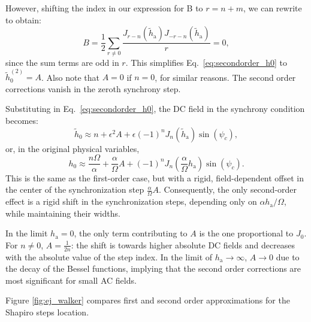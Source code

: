 \documentclass[prb,aps,twocolumn,superscriptaddress,floatfix]{revtex4-1}
\begin{document}
However, shifting the index in our expression for B to $r=n+m$, we can rewrite to obtain:
%
\begin{equation}
    B=\frac{1}{2}\sum_{r\neq 0} \frac{J_{r-n}(\tilde h_\text{a})J_{-r-n}(\tilde h_\text{a})}{r}=0,
\end{equation}
%
since the sum terms are odd in $r$. This simplifies Eq.~\eqref{eq:secondorder_h0} to $\tilde{h}_0^{(2)}=A$. Also note that $A=0$ if $n=0$, for similar reasons. The second order corrections vanish in the zeroth synchrony step.

Substituting in Eq.~\eqref{eq:secondorder_h0}, the DC field in the synchrony condition becomes:
%
\begin{equation}
    \tilde h_0 \approx n + \epsilon^2A + \epsilon(-1)^n J_n(\tilde h_\text{a})\sin(\psi_c),
\end{equation}
%
or, in the original physical variables,
%
\begin{equation}
    h_0 \approx \frac{n\Omega}{\alpha} + \frac{\alpha}{\Omega}A + (-1)^n J_n(\frac{\alpha}{\Omega} h_\text{a})\sin(\psi_c).
    \label{eq:h0_2order}
\end{equation}
%
This is the same as the first-order case, but with a rigid, field-dependent offset in the center of the synchronization step $\frac{\alpha}{\Omega}A$. Consequently, the only second-order effect is a rigid shift in the synchronization steps, depending only on $\alpha h_\text {a}/\Omega$, while maintaining their widths.

In the limit $h_\text{a}=0$, the only term contributing to $A$ is the one proportional to $J_0$. For $n\neq0$, $A=\frac{1}{2n}$: the shift is towards higher absolute DC fields and decreases with the absolute value of the step index. In the limit of $h_\text{a}\to\infty$, $A\to 0$ due to the decay of the Bessel functions, implying that the second order corrections are most significant for small AC fields.

Figure \ref{fig:ej_walker} compares first and second order approximations for the Shapiro steps location.

% 

\tableofcontents
\end{document}

